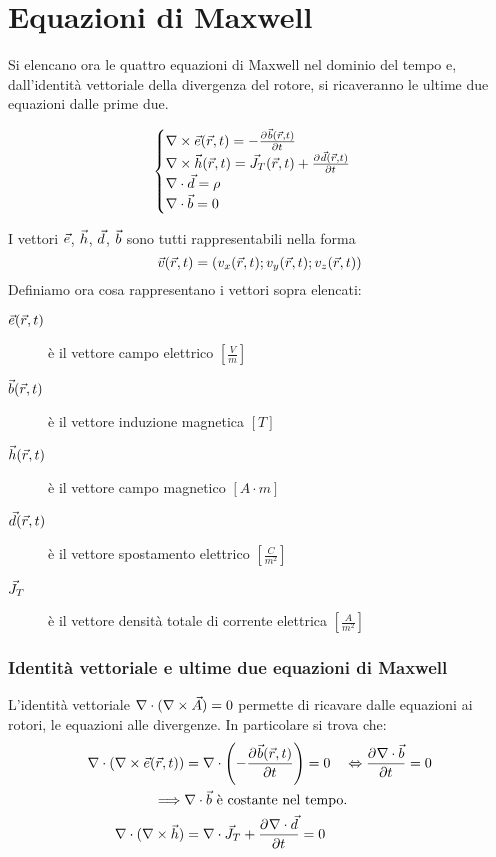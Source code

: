 \section{Equazioni di Maxwell}
Si elencano ora le quattro equazioni di Maxwell nel dominio del tempo e, dall'identità
vettoriale della divergenza del rotore, si ricaveranno le ultime due equazioni dalle prime due.

\begin{equation}\begin{cases}
  \nabla\times \vec{e}(\vec{r},t) = -\frac{\partial^{} {\vec{b}(\vec{r},t)}}{\partial {t}^{}} \\
  \nabla\times \vec{h}(\vec{r},t) = \vec{J}_T(\vec{r},t) + \frac{\partial^{} {\vec{d}(\vec{r},t)}}{\partial {t}^{}} \\
  \nabla\cdot \vec{d} = \rho \\
  \nabla\cdot \vec{b} = 0
\end{cases}\label{eq:maxwell}\end{equation}

I vettori $\vec{e}$, $\vec{h}$, $\vec{d}$, $\vec{b}$ sono tutti rappresentabili nella forma
$$\vec{v}(\vec{r},t) = \left(v_x(\vec{r},t);v_y(\vec{r},t);v_z(\vec{r},t)\right)$$
Definiamo ora cosa rappresentano i vettori sopra elencati:
\begin{description}
  \item[$\vec{e}(\vec{r},t)$ ] è il vettore campo elettrico $\left[\frac{V}{m}\right]$
  \item[$\vec{b}(\vec{r},t)$] è il vettore induzione magnetica $[T]$
  \item[$\vec{h}(\vec{r},t)$] è il vettore campo magnetico $[A \cdot m]$
  \item[$\vec{d}(\vec{r},t)$] è il vettore spostamento elettrico $\left[\frac{C}{m^2}\right]$
  \item[$\vec{J}_T$] è il vettore densità totale di corrente elettrica $\left[\frac{A}{m^2}\right]$
\end{description}

\subsubsection{Identità vettoriale e ultime due equazioni di Maxwell}
L'identità vettoriale $\nabla\cdot (\nabla\times \vec{A}) = 0$ permette di ricavare
dalle equazioni ai rotori, le equazioni alle divergenze. In particolare si trova che:
\begin{equation}\begin{split}
  \nabla\cdot (\nabla\times \vec{e}(\vec{r},t)) &= \nabla\cdot \left(-\frac{\partial^{} {\vec{b}(\vec{r},t)}}{\partial {t}^{}}\right)=0 \quad \Leftrightarrow \frac{\partial^{} {\nabla\cdot \vec{b}}}{\partial {t}^{}}=0\\
  \implies & \nabla\cdot \vec{b} \text{ è costante nel tempo.}\\
  \nabla\cdot(\nabla\times \vec{h}) &= \nabla\cdot \vec{J}_T + \frac{\partial^{} {\nabla\cdot \vec{d}}}{\partial {t}^{}}=0
\end{split}\end{equation}


